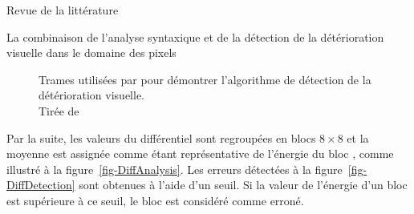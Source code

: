 \documentclass[letterpaper, twoside, 12pt,memoire]{thETS}
\newcommand{\fig}[1]{figure~\ref{#1}}
\begin{document}
\begin{chapter}{Revue de la littérature}
\begin{section}{La combinaison de l'analyse syntaxique et de la détection de la
détérioration visuelle dans le domaine des pixels}
\begin{figure}
\caption{Trames utilisées par \citeauthor{Ikuno2007} pour démontrer l'algorithme
de détection de la détérioration visuelle.\\Tirée de \citet[p.~25]{Ikuno2007}}
\label{fig-IkunoForeman}
\end{figure}

Par la suite, les valeurs du différentiel sont regroupées en blocs $8 \times 8$
et la moyenne est assignée comme étant représentative de l'énergie du bloc
\citep[p.~27-28]{Ikuno2007}, comme illustré à la \fig{fig-DiffAnalysis}. Les
erreurs détectées à la \fig{fig-DiffDetection} sont obtenues à l'aide d'un
seuil. Si la valeur de l'énergie d'un bloc est supérieure à ce seuil, le
bloc est considéré comme erroné.


\end{section}
\end{chapter}
\end{document}
